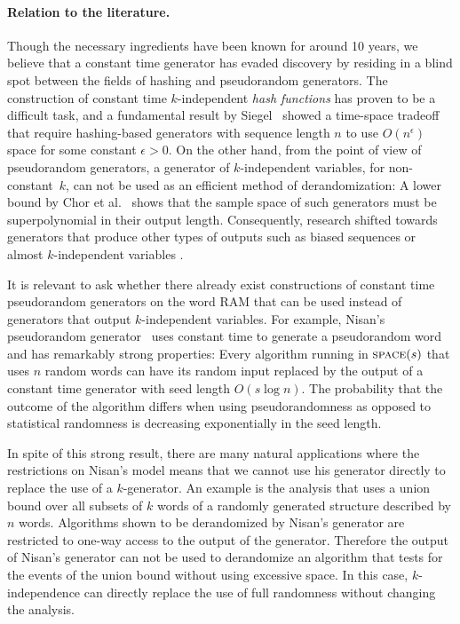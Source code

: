 \documentclass[a4paper,11pt]{article}
\theoremstyle{plain}
\theoremstyle{definition}
\begin{document}
\paragraph{Relation to the literature.}
Though the necessary ingredients have been known for around 10 years, we believe that a constant time generator has evaded discovery by residing in a blind spot between the fields of hashing and pseudorandom generators. 
The construction of constant time $k$-independent \emph{hash functions} has proven to be a difficult task, and a fundamental result by Siegel~\cite{siegel2004} showed a time-space tradeoff that require hashing-based generators with sequence length $n$ to use $O(n^{\epsilon})$ space for some constant $\epsilon > 0$. 
On the other hand, from the point of view of pseudorandom generators, a generator of $k$-independent variables, for non-constant~$k$, can not be used as an efficient method of derandomization: 
A lower bound by Chor et al.~\cite{chor1985} shows that the sample space of such generators must be superpolynomial in their output length. 
Consequently, research shifted towards generators that produce other types of outputs such as biased sequences or almost $k$-independent variables \cite{alon1992, naor1993, goldreich2010}. 

It is relevant to ask whether there already exist constructions of constant time pseudorandom generators on the word RAM that can be used instead of generators that output $k$-independent variables. 
For example, Nisan's pseudorandom generator~\cite{nisan1992} uses constant time to generate a pseudorandom word and has remarkably strong properties: 
Every algorithm running in $\textsc{space}(s)$ that uses $n$ random words can have its random input replaced by the output of a constant time generator with seed length $O(s \log n)$. 
The probability that the outcome of the algorithm differs when using pseudorandomness as opposed to statistical randomness is decreasing exponentially in the seed length. 

In spite of this strong result, there are many natural applications where the restrictions on Nisan's model means that we cannot use his generator directly to replace the use of a $k$-generator. 
An example is the analysis that uses a union bound over all subsets of $k$ words of a randomly generated structure described by $n$ words.
Algorithms shown to be derandomized by Nisan's generator are restricted to one-way access to the output of the generator. 
Therefore the output of Nisan's generator can not be used to derandomize an algorithm that tests for the events of the union bound without using excessive space.
In this case, \mbox{$k$-independence} can directly replace the use of full randomness without changing the analysis.
\end{document}
